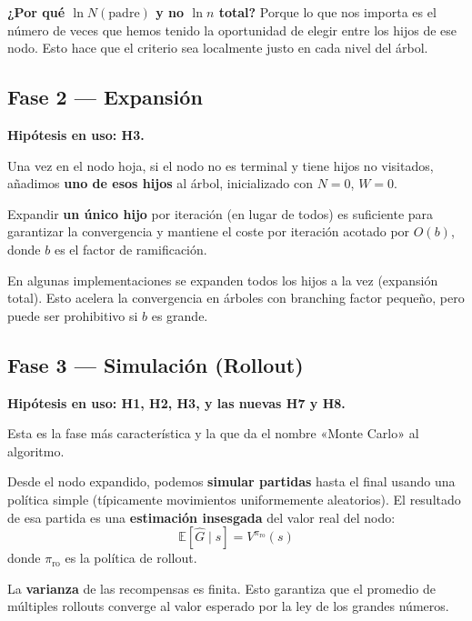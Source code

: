 \documentclass[12pt, a4paper]{article}
\newcounter{hipnum}
\newcommand{\hip}[1]{%
  \stepcounter{hipnum}%
  \begin{tcolorbox}[hipotesis, title={Hipótesis H\thehipnum}]
    #1
  \end{tcolorbox}%
}
\begin{document}
\begin{tcolorbox}[nota]
\textbf{¿Por qué $\ln N(\mathrm{padre})$ y no $\ln n$ total?} Porque lo que
nos importa es el número de veces que hemos tenido la oportunidad de elegir
entre los hijos de ese nodo. Esto hace que el criterio sea localmente justo
en cada nivel del árbol.
\end{tcolorbox}

\subsection{Fase 2 — Expansión}

\textbf{Hipótesis en uso: H3.}

Una vez en el nodo hoja, si el nodo no es terminal y tiene hijos no visitados,
añadimos \textbf{uno de esos hijos} al árbol, inicializado con $N = 0$,
$W = 0$.

\hip{Expandir \textbf{un único hijo} por iteración (en lugar de todos) es
suficiente para garantizar la convergencia y mantiene el coste por iteración
acotado por $O(b)$, donde $b$ es el factor de ramificación.}

En algunas implementaciones se expanden todos los hijos a la vez (expansión
total). Esto acelera la convergencia en árboles con branching factor pequeño,
pero puede ser prohibitivo si $b$ es grande.

\subsection{Fase 3 — Simulación (Rollout)}

\textbf{Hipótesis en uso: H1, H2, H3, y las nuevas H7 y H8.}

Esta es la fase más característica y la que da el nombre «Monte Carlo» al
algoritmo.

\hip{Desde el nodo expandido, podemos \textbf{simular partidas} hasta el
final usando una política simple (típicamente movimientos uniformemente
aleatorios). El resultado de esa partida es una \textbf{estimación insesgada}
del valor real del nodo:
\[
  \mathbb{E}[\hat{G} \mid s] = V^{\pi_{\mathrm{ro}}}(s)
\]
donde $\pi_{\mathrm{ro}}$ es la política de rollout.}

\hip{La \textbf{varianza} de las recompensas es finita. Esto garantiza que el
promedio de múltiples rollouts converge al valor esperado por la ley de los
grandes números.}
\end{document}
